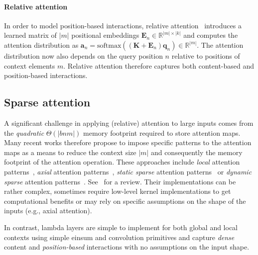\documentclass{article} \usepackage{iclr2021_conference,times}
\begin{document}
\vspace{-0.1cm}
\paragraph{Relative attention}
In order to model position-based interactions, relative attention~\citep{shaw2018relative} introduces a learned matrix of $|m|$ positional embeddings $\boldsymbol{E}_n \in \mathbb{R}^{|m|\times|k|}$ and computes the attention distribution as $\boldsymbol{a}_n = \textrm{softmax}((\boldsymbol{K}+\boldsymbol{E}_n) \boldsymbol{q}_n) \in \mathbb{R}^{|m|}$.
The attention distribution now also depends on the query position $n$ relative to positions of context elements $m$.
Relative attention therefore captures both content-based and position-based interactions.

\vspace{-0.1cm}
\subsection{Sparse attention~\label{sec:sparse_attention}}
A significant challenge in applying (relative) attention to large inputs comes from the \emph{quadratic} $\Theta(|bnm|)$ memory footprint required to store attention maps.
Many recent works therefore propose to impose specific patterns to the attention maps as a means to reduce the context size $|m|$ and consequently the memory footprint of the attention operation.
These approaches include \emph{local} attention patterns~\citep{dai2019xl,parmar2018image,ramachandran2019sasa}, \emph{axial} attention patterns~\citep{ho2019axial,wang2020axialdeeplab}, \emph{static sparse} attention patterns~\citep{child2019sparse,beltagy2020longformer} or \emph{dynamic sparse} attention patterns~\citep{kitaev2020reformer}.
See~\cite{tay2020efficient} for a review.
Their implementations can be rather complex, sometimes require low-level kernel implementations to get computational benefits or may rely on specific assumptions on the shape of the inputs (e.g., axial attention).

In contrast, lambda layers are simple to implement for both global and local contexts using simple einsum and convolution primitives and capture \emph{dense} content and \emph{position-based} interactions with no assumptions on the input shape.

\vspace{-0.1cm}
\end{document}
